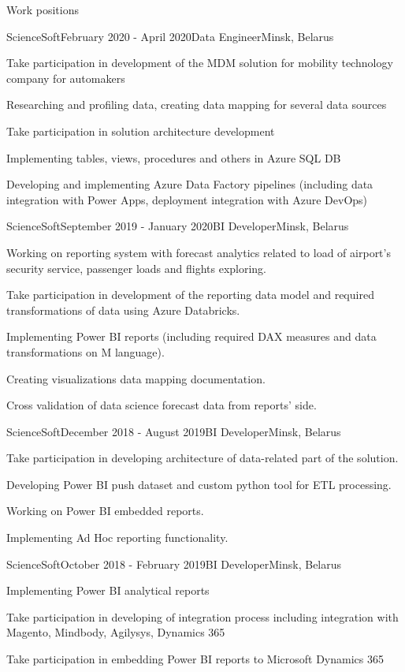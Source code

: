 \documentclass{resume} %
\begin{document}
\begin{rSection}{Work positions}
\begin{rSubsection}{ScienceSoft}{February 2020 - April 2020}{Data Engineer}{Minsk, Belarus}
\item Take participation in development of the MDM solution for mobility technology company for automakers
\item Researching and profiling data, creating data mapping for several data sources
\item Take participation in solution architecture development
\item Implementing tables, views, procedures and others in Azure SQL DB
\item Developing and implementing Azure Data Factory pipelines (including data integration with Power Apps, deployment integration with Azure DevOps)
\end{rSubsection}

\begin{rSubsection}{ScienceSoft}{September 2019 - January 2020}{BI Developer}{Minsk, Belarus}
\item Working on reporting system with forecast analytics related to load of airport's security service, passenger loads and flights exploring.
\item Take participation in development of the reporting data model and required transformations of data using Azure Databricks.
\item Implementing Power BI reports (including required DAX measures and data transformations on M language).
\item Creating visualizations data mapping documentation.
\item Cross validation of data science forecast data from reports' side.
\end{rSubsection}

\begin{rSubsection}{ScienceSoft}{December 2018 - August 2019}{BI Developer}{Minsk, Belarus}
\item Take participation in developing architecture of data-related part of the solution.
\item Developing Power BI push dataset and custom python tool for ETL processing.
\item Working on Power BI embedded reports.
\item Implementing Ad Hoc reporting functionality.
\end{rSubsection}

\begin{rSubsection}{ScienceSoft}{October 2018 - February 2019}{BI Developer}{Minsk, Belarus}
\item Implementing Power BI analytical reports
\item Take participation in developing of integration process including integration with Magento, Mindbody, Agilysys, Dynamics 365
\item Take participation in embedding Power BI reports to Microsoft Dynamics 365
\end{rSubsection}


\end{rSection}
\end{document}
